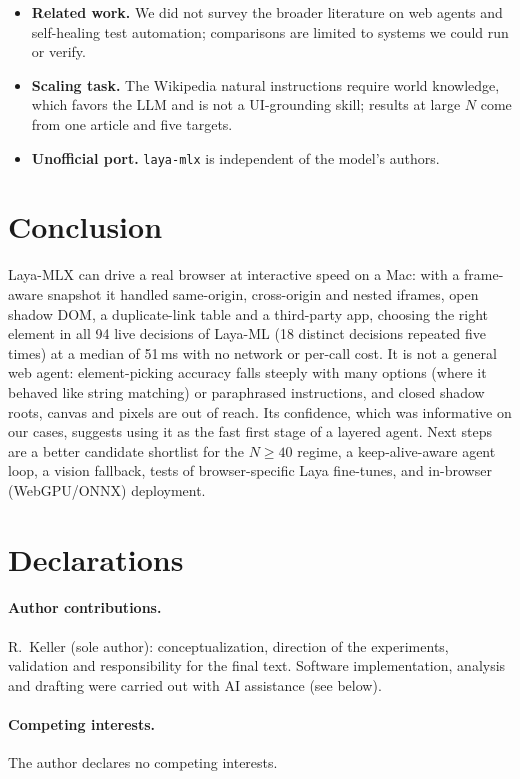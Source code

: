 \documentclass[11pt,a4paper]{article}
\begin{document}
\begin{itemize}
\item \textbf{Related work.} We did not survey the broader literature on web agents and self-healing test automation; comparisons are limited to systems we could run or verify.
\item \textbf{Scaling task.} The Wikipedia natural instructions require world knowledge, which favors the LLM and is not a UI-grounding skill; results at large $N$ come from one article and five targets.
\item \textbf{Unofficial port.} \texttt{laya-mlx} is independent of the model's authors.
\end{itemize}

\section{Conclusion}
Laya-MLX can drive a real browser at interactive speed on a Mac: with a frame-aware snapshot it handled same-origin, cross-origin and nested iframes, open shadow DOM, a duplicate-link table and a third-party app, choosing the right element in all 94 live decisions of Laya-ML (18 distinct decisions repeated five times) at a median of 51\,ms with no network or per-call cost. It is not a general web agent: element-picking accuracy falls steeply with many options (where it behaved like string matching) or paraphrased instructions, and closed shadow roots, canvas and pixels are out of reach. Its confidence, which was informative on our cases, suggests using it as the fast first stage of a layered agent. Next steps are a better candidate shortlist for the $N\ge40$ regime, a keep-alive-aware agent loop, a vision fallback, tests of browser-specific Laya fine-tunes, and in-browser (WebGPU/ONNX) deployment.

\section*{Declarations}
\paragraph{Author contributions.} R.~Keller (sole author): conceptualization, direction of the experiments, validation and responsibility for the final text. Software implementation, analysis and drafting were carried out with AI assistance (see below).
\paragraph{Competing interests.} The author declares no competing interests.
\end{document}
